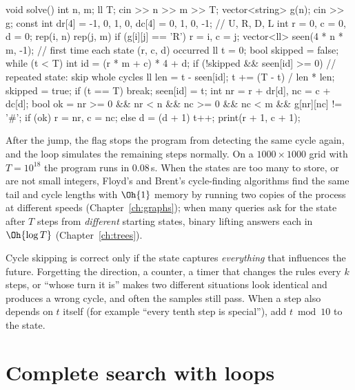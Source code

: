 \begin{code}
void solve() {
    int n, m;
    ll T;
    cin >> n >> m >> T;
    vector<string> g(n);
    cin >> g;
    const int dr[4] = {-1, 0, 1, 0}, dc[4] = {0, 1, 0, -1};  // U, R, D, L
    int r = 0, c = 0, d = 0;
    rep(i, n) rep(j, m) if (g[i][j] == 'R') r = i, c = j;
    vector<ll> seen(4 * n * m, -1);  // first time each state (r, c, d) occurred
    ll t = 0;
    bool skipped = false;
    while (t < T) {
        int id = (r * m + c) * 4 + d;
        if (!skipped && seen[id] >= 0) {  // repeated state: skip whole cycles
            ll len = t - seen[id];
            t += (T - t) / len * len;
            skipped = true;
            if (t == T) break;
        }
        seen[id] = t;
        int nr = r + dr[d], nc = c + dc[d];
        bool ok = nr >= 0 && nr < n && nc >= 0 && nc < m && g[nr][nc] != '#';
        if (ok) r = nr, c = nc;
        else d = (d + 1) %
        t++;
    }
    print(r + 1, c + 1);
}
\end{code}

After the jump, the flag  stops the program from detecting the same cycle again, and the loop simulates the
remaining steps normally. On a $1000 \times 1000$ grid with $T = 10^{18}$ the program runs in 0.08\,s. When the states are
too many to store, or are not small integers, Floyd's and Brent's cycle-finding algorithms find the same tail and cycle
lengths with $\Oh{1}$ memory by running two copies of the process at different speeds (Chapter~\ref{ch:graphs}); when many
queries ask for the state after $T$ steps from \emph{different} starting states, binary lifting answers each in
$\Oh{\log T}$ (Chapter~\ref{ch:trees}).

\begin{pitfall}
Cycle skipping is correct only if the state captures \emph{everything} that influences the future. Forgetting the direction,
a counter, a timer that changes the rules every $k$ steps, or ``whose turn it is'' makes two different situations look
identical and produces a wrong cycle, and often the samples still pass. When a step also depends on $t$ itself (for example
``every tenth step is special''), add $t \bmod 10$ to the state.
\end{pitfall}

\section[Complete search with loops]{Complete search with loops \hfill \bronze}\label{sec:search-loops}

